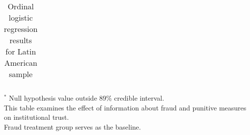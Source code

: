 \begin{table}
\begin{center}
\begin{threeparttable}
\begin{tabular}{l c c c c c c}
\hline
\end{tabular}
\begin{tablenotes}[flushleft]
\scriptsize{$^*$ Null hypothesis value outside 89\% credible interval.  \\
This table examines the effect of information about fraud
                      and punitive measures on institutional trust. \\
Fraud treatment group serves as the baseline.}
\end{tablenotes}
\end{threeparttable}
\caption{Ordinal logistic regression results for Latin American sample}
\label{table:coefficients}
\end{center}
\end{table}
